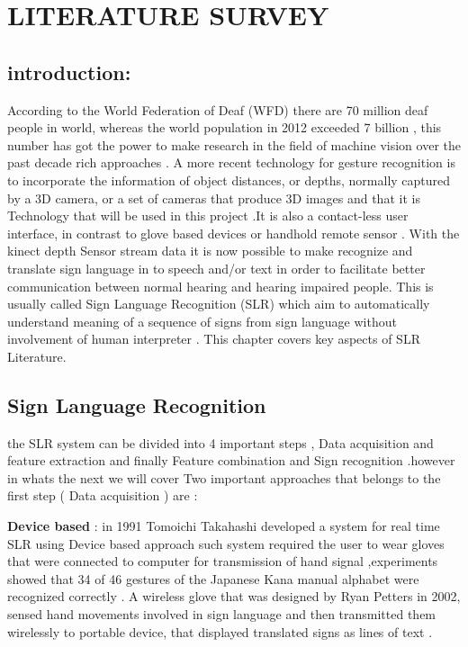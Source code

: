 

\chapter{LITERATURE SURVEY} \label{chapter1}

\section{introduction:} 

According to the World Federation of Deaf (WFD) \cite{wfd} there are 70 million deaf people in world, whereas the world population in 2012 exceeded 7 billion  , this number has got the power to make research in the field of machine vision  over  the  past  decade rich  approaches .
A  more  recent   technology  for gesture   recognition  is to  incorporate   the  information   of object   distances,   or depths,   normally   captured   by a 3D camera,   or a set  of cameras  that  produce 3D images and that it is Technology that will be used in this project  .It is also a contact-less  user interface,   in contrast   to glove based   devices  or handhold  remote  sensor .
With the kinect depth Sensor stream data it is now possible to make recognize and  translate sign language in to speech and/or text in order to facilitate better communication between normal hearing and hearing impaired people. This is usually called Sign Language Recognition (SLR) which  aim  to automatically understand meaning of a sequence of signs from sign language without involvement of human interpreter \cite{27}. This chapter covers key aspects of SLR Literature.

\section{ Sign  Language Recognition}  

the SLR system can be divided into 4 important  steps , Data acquisition and feature extraction and finally Feature combination and Sign recognition .however in whats the next  we will cover Two important approaches that   belongs to the first step ( Data acquisition ) are  :

\textbf{Device based }:
in  1991 Tomoichi Takahashi   developed a system for real time SLR  using Device based approach such system required the user to wear gloves that were connected to computer for transmission of hand signal ,experiments showed that 34 of 46 gestures of the Japanese Kana manual alphabet were recognized correctly \cite{29}
.
A wireless glove that was designed by Ryan Petters  \cite{31}in 2002, sensed hand movements involved in sign language and then transmitted them wirelessly to portable device, that displayed translated signs as lines of text .
 

